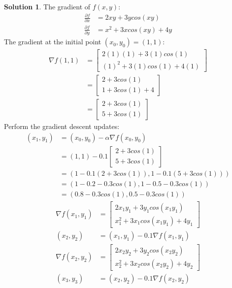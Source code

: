 \documentclass[11pt]{article}
\theoremstyle{definition}
\newtheorem*{solution}{Solution}
\begin{document}
\begin{solution}
    The gradient of $f(x,y)$:
    \begin{align}
        \frac{\partial f}{\partial x} &= 2xy + 3ycos(xy) \\
        \frac{\partial f}{\partial y} &= x^2 + 3xcos(xy) + 4y
    \end{align}
    The gradient at the initial point $(x_0, y_0) = (1,1)$:
    \begin{align}
        \nabla f(1,1) &= \begin{bmatrix}
            2(1)(1) + 3(1)cos(1) \\
            (1)^2 + 3(1)cos(1) + 4(1)
        \end{bmatrix} \\
        &= \begin{bmatrix}
            2 + 3cos(1) \\
            1 + 3cos(1) + 4
        \end{bmatrix} \\
        &= \begin{bmatrix}
            2 + 3cos(1) \\
            5 + 3cos(1)
        \end{bmatrix}
    \end{align}
    Perform the gradient descent updates:
    \begin{align}
        (x_1, y_1) &= (x_0, y_0) - \alpha \nabla f(x_0, y_0) \\
        &= (1, 1) - 0.1 \begin{bmatrix}
            2 + 3cos(1) \\
            5 + 3cos(1)
        \end{bmatrix} \\
        &= (1 - 0.1(2 + 3cos(1)), 1 - 0.1(5 + 3cos(1))) \\
        &= (1 - 0.2 - 0.3cos(1), 1 - 0.5 - 0.3cos(1)) \\
        &= (0.8 - 0.3cos(1), 0.5 - 0.3cos(1))
    \end{align}
    \begin{align}
        \nabla f(x_1, y_1) &= \begin{bmatrix}
            2x_1y_1 + 3y_1cos(x_1y_1) \\
            x_1^2 + 3x_1cos(x_1y_1) + 4y_1
        \end{bmatrix} \\
        (x_2, y_2) &= (x_1, y_1) - 0.1 \nabla f(x_1, y_1) \\
        \nabla f(x_2, y_2) &= \begin{bmatrix}
            2x_2y_2 + 3y_2cos(x_2y_2) \\
            x_2^2 + 3x_2cos(x_2y_2) + 4y_2
        \end{bmatrix} \\
        (x_3, y_3) &= (x_2, y_2) - 0.1 \nabla f(x_2, y_2)
    \end{align}
\end{solution}
\end{document}
